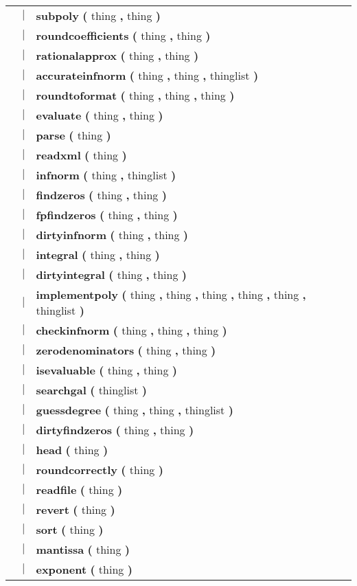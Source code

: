 \begin{tabular}{lcl}
 & $|$ & \textbf{subpoly} \textbf{(} thing \textbf{,} thing \textbf{)} \\
 & $|$ & \textbf{roundcoefficients} \textbf{(} thing \textbf{,} thing \textbf{)} \\
 & $|$ & \textbf{rationalapprox} \textbf{(} thing \textbf{,} thing \textbf{)} \\
 & $|$ & \textbf{accurateinfnorm} \textbf{(} thing \textbf{,} thing \textbf{,} thinglist \textbf{)} \\
 & $|$ & \textbf{roundtoformat} \textbf{(} thing \textbf{,} thing \textbf{,} thing \textbf{)} \\
 & $|$ & \textbf{evaluate} \textbf{(} thing \textbf{,} thing \textbf{)} \\
 & $|$ & \textbf{parse} \textbf{(} thing \textbf{)} \\
 & $|$ & \textbf{readxml} \textbf{(} thing \textbf{)} \\
 & $|$ & \textbf{infnorm} \textbf{(} thing \textbf{,} thinglist \textbf{)} \\
 & $|$ & \textbf{findzeros} \textbf{(} thing \textbf{,} thing \textbf{)} \\
 & $|$ & \textbf{fpfindzeros} \textbf{(} thing \textbf{,} thing \textbf{)} \\
 & $|$ & \textbf{dirtyinfnorm} \textbf{(} thing \textbf{,} thing \textbf{)} \\
 & $|$ & \textbf{integral} \textbf{(} thing \textbf{,} thing \textbf{)} \\
 & $|$ & \textbf{dirtyintegral} \textbf{(} thing \textbf{,} thing \textbf{)} \\
 & $|$ & \textbf{implementpoly} \textbf{(} thing \textbf{,} thing \textbf{,} thing \textbf{,} thing \textbf{,} thing \textbf{,} thinglist \textbf{)} \\
 & $|$ & \textbf{checkinfnorm} \textbf{(} thing \textbf{,} thing \textbf{,} thing \textbf{)} \\
 & $|$ & \textbf{zerodenominators} \textbf{(} thing \textbf{,} thing \textbf{)} \\
 & $|$ & \textbf{isevaluable} \textbf{(} thing \textbf{,} thing \textbf{)} \\
 & $|$ & \textbf{searchgal} \textbf{(} thinglist \textbf{)} \\
 & $|$ & \textbf{guessdegree} \textbf{(} thing \textbf{,} thing \textbf{,} thinglist \textbf{)} \\
 & $|$ & \textbf{dirtyfindzeros} \textbf{(} thing \textbf{,} thing \textbf{)} \\
 & $|$ & \textbf{head} \textbf{(} thing \textbf{)} \\
 & $|$ & \textbf{roundcorrectly} \textbf{(} thing \textbf{)} \\
 & $|$ & \textbf{readfile} \textbf{(} thing \textbf{)} \\
 & $|$ & \textbf{revert} \textbf{(} thing \textbf{)} \\
 & $|$ & \textbf{sort} \textbf{(} thing \textbf{)} \\
 & $|$ & \textbf{mantissa} \textbf{(} thing \textbf{)} \\
 & $|$ & \textbf{exponent} \textbf{(} thing \textbf{)} \\
\end{tabular}\\
